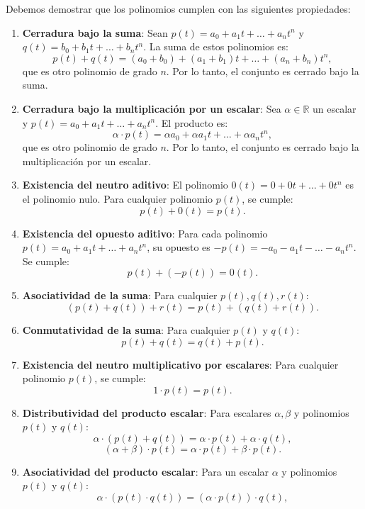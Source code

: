\documentclass{article}
\begin{document}
Debemos demostrar que los polinomios cumplen con las siguientes propiedades:

\begin{enumerate}
    \item \textbf{Cerradura bajo la suma}: Sean \( p(t) = a_0 + a_1 t + \dots + a_n t^n \) y \( q(t) = b_0 + b_1 t + \dots + b_n t^n \). La suma de estos polinomios es:
    \[
    p(t) + q(t) = (a_0 + b_0) + (a_1 + b_1)t + \dots + (a_n + b_n)t^n,
    \]
    que es otro polinomio de grado \( n \). Por lo tanto, el conjunto es cerrado bajo la suma.

    \item \textbf{Cerradura bajo la multiplicación por un escalar}: Sea \( \alpha \in \mathbb{R} \) un escalar y \( p(t) = a_0 + a_1 t + \dots + a_n t^n \). El producto es:
    \[
    \alpha \cdot p(t) = \alpha a_0 + \alpha a_1 t + \dots + \alpha a_n t^n,
    \]
    que es otro polinomio de grado \( n \). Por lo tanto, el conjunto es cerrado bajo la multiplicación por un escalar.

    \item \textbf{Existencia del neutro aditivo}: El polinomio \( 0(t) = 0 + 0t + \dots + 0t^n \) es el polinomio nulo. Para cualquier polinomio \( p(t) \), se cumple:
    \[
    p(t) + 0(t) = p(t).
    \]

    \item \textbf{Existencia del opuesto aditivo}: Para cada polinomio \( p(t) = a_0 + a_1 t + \dots + a_n t^n \), su opuesto es \( -p(t) = -a_0 - a_1 t - \dots - a_n t^n \). Se cumple:
    \[
    p(t) + (-p(t)) = 0(t).
    \]

    \item \textbf{Asociatividad de la suma}: Para cualquier \( p(t), q(t), r(t) \):
    \[
    (p(t) + q(t)) + r(t) = p(t) + (q(t) + r(t)).
    \]

    \item \textbf{Conmutatividad de la suma}: Para cualquier \( p(t) \) y \( q(t) \):
    \[
    p(t) + q(t) = q(t) + p(t).
    \]

    \item \textbf{Existencia del neutro multiplicativo por escalares}: Para cualquier polinomio \( p(t) \), se cumple:
    \[
    1 \cdot p(t) = p(t).
    \]

    \item \textbf{Distributividad del producto escalar}: Para escalares \( \alpha, \beta \) y polinomios \( p(t) \) y \( q(t) \):
    \[
    \alpha \cdot (p(t) + q(t)) = \alpha \cdot p(t) + \alpha \cdot q(t),
    \]
    \[
    (\alpha + \beta) \cdot p(t) = \alpha \cdot p(t) + \beta \cdot p(t).
    \]

    \item \textbf{Asociatividad del producto escalar}: Para un escalar \( \alpha\) y polinomios \( p(t) \) y \( q(t) \):
    $$
    \alpha \cdot (p(t) \cdot q(t)) = (\alpha \cdot p(t)) \cdot q(t),
     $$

\end{enumerate}
\end{document}
